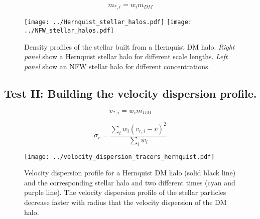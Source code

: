 \documentclass[14pt]{article}
\begin{document}
\begin{equation}
  m_{*,i} = w_i m_{DM} 
\end{equation}

\begin{figure}[H]
   \texttt{[image: ../Hernquist\_stellar\_halos.pdf]}
   \texttt{[image: ../NFW\_stellar\_halos.pdf]}
   \caption{Density profiles of the stellar built from a Hernquist DM halo.
   \textit{Right panel} show a Hernquist stellar halo for different scale
   lengths. \textit{Left panel} show an NFW stellar halo for different
   concentrations.}
\end{figure}

\subsection{Test II: Building the velocity dispersion profile. }

\begin{equation}
  v_{*,i} = w_i m_{DM} 
\end{equation}


\begin{equation}
  \sigma_r = \dfrac{\sum_i w_i (v_{r,i}-\bar{v})^2}{\sum_i w_i}
\end{equation}

\begin{figure}[H]
  \centering
  \texttt{[image: ../velocity\_dispersion\_tracers\_hernquist.pdf]}
  \caption{Velocity dispersion profile for a Hernquist DM halo (solid black line)  and
  the corresponding stellar halo and two different times (cyan and purple line).
  The velocity dispersion profile of the stellar particles decrease faster with
  radius that the velocity dispersion of the DM halo.}
\end{figure}
\end{document}
